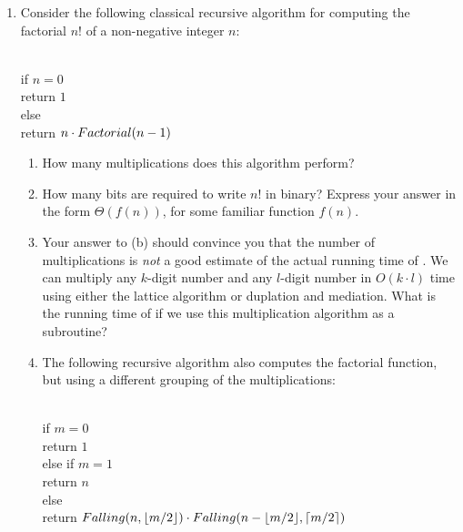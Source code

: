 \begin{exercises}
\begin{enumerate}[label=\arabic*.,ref=\thechapter.\arabic*,leftmargin=*,align=left,itemsep=1.5ex plus 0.5ex,resume]
\begin{enumerate}
\end{enumerate}
\item Consider the following classical recursive algorithm for computing the factorial $n!$ of a non-negative integer $n$:
\begin{pseudocode}
\\
if $n = 0$\\
\Indent return $1$\\
else\\
\Indent return $n \cdot Factorial(n-1)$
\end{pseudocode}
\begin{enumerate}
\item How many multiplications does this algorithm perform?
\item How many bits are required to write $n!$ in binary? Express your answer in the form $\Theta( f(n))$, for some familiar function $f(n)$. 
\item Your answer to (b) should convince you that the number of multiplications is \emph{not} a good estimate of the actual running time of . We can multiply any $k$-digit number and any $l$-digit number in $O(k \cdot l)$ time using either the lattice algorithm or duplation and mediation. What is the running time of  if we use this multiplication algorithm as a subroutine?
\item The following recursive algorithm also computes the factorial function, but using a different grouping of the multiplications:
\begin{pseudocode}
 \\
if $m = 0$\\
\Indent return $1$\\
else if $m = 1$\\
\Indent return $n$\\
else\\
\Indent return $Falling(n, \lfloor m/2\rfloor) \cdot Falling(n - \lfloor m/2\rfloor, \lceil m/2\rceil)$
\end{pseudocode}


\end{enumerate}
\end{enumerate}
\end{exercises}
